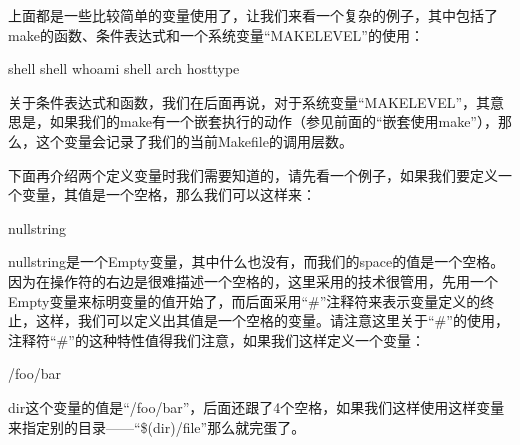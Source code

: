 \documentclass[a4paper,10pt]{sphinxmanual}
\begin{document}
上面都是一些比较简单的变量使用了，让我们来看一个复杂的例子，其中包括了make的函数、条件表达式和一个系统变量“MAKELEVEL”的使用：

\begin{sphinxVerbatim}[commandchars=\\\{\}]
    shell 
     shell whoami
  shell arch
   host\PYGZhy{}type 
\end{sphinxVerbatim}

关于条件表达式和函数，我们在后面再说，对于系统变量“MAKELEVEL”，其意思是，如果我们的make有一个嵌套执行的动作（参见前面的“嵌套使用make”），那么，这个变量会记录了我们的当前Makefile的调用层数。

下面再介绍两个定义变量时我们需要知道的，请先看一个例子，如果我们要定义一个变量，其值是一个空格，那么我们可以这样来：

\begin{sphinxVerbatim}[commandchars=\\\{\}]
 
  nullstring 
\end{sphinxVerbatim}

nullstring是一个Empty变量，其中什么也没有，而我们的space的值是一个空格。因为在操作符的右边是很难描述一个空格的，这里采用的技术很管用，先用一个Empty变量来标明变量的值开始了，而后面采用“\#”注释符来表示变量定义的终止，这样，我们可以定义出其值是一个空格的变量。请注意这里关于“\#”的使用，注释符“\#”的这种特性值得我们注意，如果我们这样定义一个变量：

\begin{sphinxVerbatim}[commandchars=\\\{\}]
  /foo/bar    
\end{sphinxVerbatim}

dir这个变量的值是“/foo/bar”，后面还跟了4个空格，如果我们这样使用这样变量来指定别的目录——“\$(dir)/file”那么就完蛋了。
\end{document}

